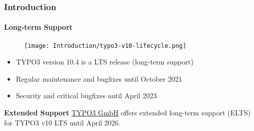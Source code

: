 
\begin{frame}[fragile]
	\frametitle{Introduction}
	\framesubtitle{Long-term Support}

	\begin{figure}
		\texttt{[image: Introduction/typo3-v10-lifecycle.png]}
	\end{figure}

	\begin{itemize}
		\item TYPO3 version 10.4 is a LTS release (long-term support)
		\item Regular maintenance and bugfixes until October 2021
		\item Security and critical bugfixes until April 2023
	\end{itemize}
	\vspace{0.2cm}
	\textbf{Extended Support}\newline
	\smaller
		\href{https://typo3.com}{TYPO3 GmbH} offers extended long-term
			support (ELTS) for TYPO3 v10 LTS until April 2026.
	\normalsize

\end{frame}

